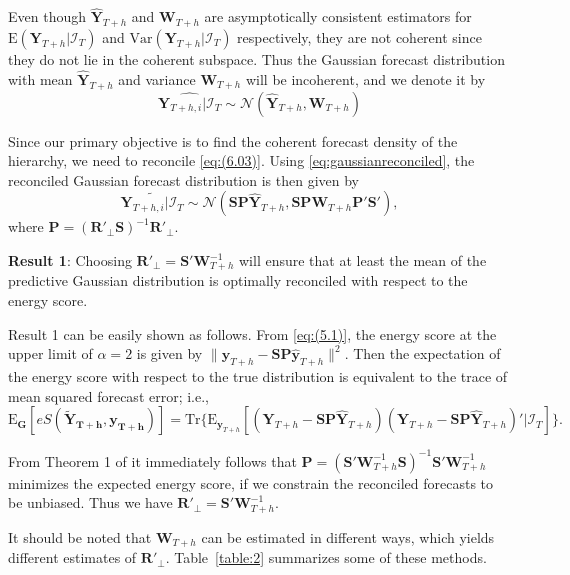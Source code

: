 \documentclass[a4paper, 11pt]{article}
\def\E{\text{E}}
\theoremstyle{theo}
\theoremstyle{definition}
\begin{document}
Even though $\hat{\bm{Y}}_{T+h}$ and $\bm{W}_{T+h}$ are asymptotically consistent estimators for $\E(\bm{Y}_{T+h}|\bm{\mathcal{I}}_T)$ and $\text{Var}(\bm{Y}_{T+h}|\bm{\mathcal{I}}_T)$ respectively, they are not coherent since they do not lie in the coherent subspace. Thus the Gaussian forecast distribution with mean $\hat{\bm{Y}}_{T+h}$ and variance $\bm{W}_{T+h}$ will be incoherent, and we denote it by
\begin{equation}\label{eq:(6.03)}
\widehat{\bm{Y}_{T+h,i}|\bm{\mathcal{I}}_T} \sim \mathcal{N}(\hat{\bm{Y}}_{T+h}, \bm{W}_{T+h})
\end{equation}

Since our primary objective is to find the coherent forecast density of the hierarchy, we need to reconcile \eqref{eq:(6.03)}. Using \eqref{eq:gaussianreconciled}, the reconciled Gaussian forecast distribution is then given by
\begin{equation}\label{eq:(6.04)}
\widetilde{\bm{Y}_{T+h,i}|\bm{\mathcal{I}}_T} \sim \mathcal{N}(\bm{SP}\hat{\bm{Y}}_{T+h}, \bm{SP}\bm{W}_{T+h}\bm{P}'\bm{S}'),
\end{equation}
where $\bm{P} = (\bm{R}'_\bot \bm{S})^{-1}\bm{R}'_\bot$.

\textbf{Result 1}: Choosing $\bm{R}'_\bot = \bm{S}'\bm{W}_{T+h}^{-1}$ will ensure that at least the mean of the predictive Gaussian distribution is optimally reconciled with respect to the energy score.

Result 1 can be easily shown as follows. From \eqref{eq:(5.1)}, the energy score at the upper limit of $\alpha=2$ is given by $\|\bm{y}_{T+h}-\bm{SP}\hat{\bm{y}}_{T+h}\|^2$. Then the expectation of the energy score with respect to the true distribution is equivalent to the trace of mean squared forecast error; i.e.,
$$
\E_{\bm{G}}[eS(\bm{\tilde{Y}_{T+h},y_{T+h}})]= \text{Tr}\{\E_{\bm{y}_{T+h}}[(\bm{Y}_{T+h}-\bm{SP}\hat{\bm{Y}}_{T+h})(\bm{Y}_{T+h}-\bm{SP}\hat{\bm{Y}}_{T+h})'|\mathcal{I}_{T}]\}.
$$

From Theorem 1 of \citet{Wickramasuriya2017} it immediately follows that $\bm{P} = (\bm{S}'\bm{W}_{T+h}^{-1}\bm{S})^{-1}\bm{S}'\bm{W}_{T+h}^{-1}$ minimizes the expected energy score, if we constrain the reconciled forecasts to be unbiased. Thus we have $\bm{R}'_\bot = \bm{S}'\bm{W}_{T+h}^{-1}$.

It should be noted that $\bm{W}_{T+h}$ can be estimated in different ways, which yields different estimates of $\bm{R}'_\bot$. Table~\ref{table:2} summarizes some of these methods.
\end{document}
